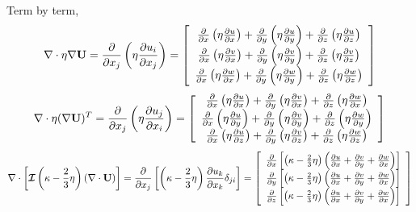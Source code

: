 \documentclass[final]{siamltex}
\def\Ub {{\bf U}}
\def\bI {\bm{\mathcal{I}}}
\begin{document}
Term by term,
\begin{equation}
\nabla\cdot\eta\nabla\Ub = \frac{\partial}{\partial x_j}\left(\eta\frac{\partial u_i}{\partial x_j}\right) =
\left[\begin{array}{c}
\frac{\partial}{\partial x}\left(\eta\frac{\partial u}{\partial x}\right) + 
\frac{\partial}{\partial y}\left(\eta\frac{\partial u}{\partial y}\right) +
\frac{\partial}{\partial z}\left(\eta\frac{\partial u}{\partial z}\right)\\
\frac{\partial}{\partial x}\left(\eta\frac{\partial v}{\partial x}\right) + 
\frac{\partial}{\partial y}\left(\eta\frac{\partial v}{\partial y}\right) +
\frac{\partial}{\partial z}\left(\eta\frac{\partial v}{\partial z}\right)\\
\frac{\partial}{\partial x}\left(\eta\frac{\partial w}{\partial x}\right) + 
\frac{\partial}{\partial y}\left(\eta\frac{\partial w}{\partial y}\right) +
\frac{\partial}{\partial z}\left(\eta\frac{\partial w}{\partial z}\right)
\end{array}\right]
\end{equation}
\begin{equation}
\nabla\cdot\eta(\nabla\Ub)^T = \frac{\partial}{\partial x_j}\left(\eta\frac{\partial u_j}{\partial x_i}\right) =
\left[\begin{array}{c}
\frac{\partial}{\partial x}\left(\eta\frac{\partial u}{\partial x}\right) + 
\frac{\partial}{\partial y}\left(\eta\frac{\partial v}{\partial x}\right) +
\frac{\partial}{\partial z}\left(\eta\frac{\partial w}{\partial x}\right)\\
\frac{\partial}{\partial x}\left(\eta\frac{\partial u}{\partial y}\right) + 
\frac{\partial}{\partial y}\left(\eta\frac{\partial v}{\partial y}\right) +
\frac{\partial}{\partial z}\left(\eta\frac{\partial w}{\partial y}\right)\\
\frac{\partial}{\partial x}\left(\eta\frac{\partial u}{\partial z}\right) + 
\frac{\partial}{\partial y}\left(\eta\frac{\partial v}{\partial z}\right) +
\frac{\partial}{\partial z}\left(\eta\frac{\partial w}{\partial z}\right)
\end{array}\right]
\end{equation}
\begin{equation}
\nabla\cdot\left[\bI\left(\kappa-\frac{2}{3}\eta\right)(\nabla\cdot\Ub)\right] = \frac{\partial}{\partial x_j}\left[\left(\kappa - \frac{2}{3}\eta\right)\frac{\partial u_k}{\partial x_k}\delta_{ji}\right] =
\left[\begin{array}{c}
\frac{\partial}{\partial x}\left[\left(\kappa-\frac{2}{3}\eta\right)\left(\frac{\partial u}{\partial x} + \frac{\partial v}{\partial y} + \frac{\partial w}{\partial x}\right)\right]\\
\frac{\partial}{\partial y}\left[\left(\kappa-\frac{2}{3}\eta\right)\left(\frac{\partial u}{\partial x} + \frac{\partial v}{\partial y} + \frac{\partial w}{\partial x}\right)\right]\\
\frac{\partial}{\partial z}\left[\left(\kappa-\frac{2}{3}\eta\right)\left(\frac{\partial u}{\partial x} + \frac{\partial v}{\partial y} + \frac{\partial w}{\partial x}\right)\right]
\end{array}\right]
\end{equation}
\end{document}
